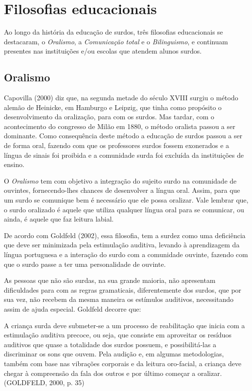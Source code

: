 \documentclass[brasil]{abnt}
\begin{document}
	\section{Filosofias educacionais}
		Ao longo da história da educação de surdos, três filosofias educacionais se destacaram, o \textit{Oralismo}, a \textit{Comunicação total} e o \textit{Bilinguismo}, e continuam presentes 
		nas instituições e/ou escolas que atendem alunos surdos.
		
		\subsection{Oralismo}
		 Capovilla (2000) diz que, na segunda metade do século XVIII surgiu o método alemão de Heinicke, em Hamburgo e Leipzig, que tinha como propósito o desenvolvimento da oralização, para com os surdos. 
		 Mas tardar, com o acontecimento do congresso de Milão em 1880, o método oralista passou a ser dominante. Como consequência deste método a educação de surdos passou a ser de forma oral, fazendo 
		 com que os professores surdos fossem exonerados e a língua de sinais foi proibida e a comunidade surda foi excluída da instituições de ensino. 
		 
		 O \textit{Oralismo} tem com objetivo a integração do sujeito surdo na comunidade de ouvintes, fornecendo-lhes chances de desenvolver a língua oral. Assim, para que um surdo se comunique bem é 
		 necessário que ele possa oralizar. Vale lembrar que, o surdo oralizado é aquele que utiliza qualquer língua oral para se comunicar, ou ainda, é aquele que faz leitura labial.
		 
		 De acordo com Goldfeld (2002), essa filosofia, tem a surdez como uma deficiência que deve ser minimizada pela estimulação auditiva, levando à aprendizagem da língua portuguesa e a interação do surdo 
		 com a comunidade ouvinte, fazendo com que o surdo passe a ter uma personalidade de ouvinte.  
		 
		 As pessoas que não são surdas, na sua grande maioria, não apresentam dificuldades para com as regras gramaticais, diferentemente dos surdos, que por sua vez, não recebem da mesma maneira os estímulos 
		 auditivos, necessitando assim de ajuda especial. Goldfeld decorre que:
		 
			\begin{citacao} A criança surda deve submeter-se a um processo de reabilitação que inicia com a estimulação auditiva precoce, ou seja, que consiste em aproveitar os resíduos auditivos que quase a 
							totalidade dos surdos possuem, e possibilitá-las a discriminar os sons que ouvem. Pela audição e, em algumas metodologias, também com base nas vibrações corporais e da leitura 
							oro-facial, a criança deve chegar à compreensão da fala dos outros e por último começar a oralizar. (GOLDFELD, 2000, p. 35) 
			\end{citacao}
		
\end{document}
